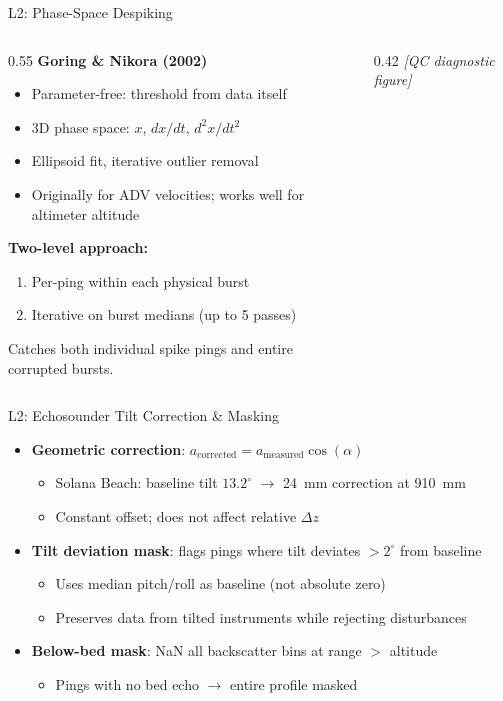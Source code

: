 \documentclass[10pt, aspectratio=169]{beamer}
\begin{document}
\begin{frame}{L2: Phase-Space Despiking}
  \begin{columns}[T]
    \begin{column}{0.55\textwidth}
      \textbf{Goring \& Nikora (2002)}
      \begin{itemize}
        \item Parameter-free: threshold from data itself
        \item 3D phase space: $x$, $dx/dt$, $d^2x/dt^2$
        \item Ellipsoid fit, iterative outlier removal
        \item Originally for ADV velocities; works well for altimeter altitude
      \end{itemize}
      \vspace{0.5em}
      \textbf{Two-level approach:}
      \begin{enumerate}
        \item Per-ping within each physical burst
        \item Iterative on burst medians (up to 5 passes)
      \end{enumerate}
      Catches both individual spike pings and entire corrupted bursts.
    \end{column}
    \begin{column}{0.42\textwidth}
      \centering\textit{[QC diagnostic figure]}
    \end{column}
  \end{columns}
\end{frame}

\begin{frame}{L2: Echosounder Tilt Correction \& Masking}
  \begin{itemize}
    \item \textbf{Geometric correction}: $a_\text{corrected} = a_\text{measured} \cos(\alpha)$
      \begin{itemize}
        \item Solana Beach: baseline tilt $13.2^\circ$ $\rightarrow$ 24~mm correction at 910~mm
        \item Constant offset; does not affect relative $\Delta z$
      \end{itemize}
    \item \textbf{Tilt deviation mask}: flags pings where tilt deviates $> 2^\circ$ from baseline
      \begin{itemize}
        \item Uses median pitch/roll as baseline (not absolute zero)
        \item Preserves data from tilted instruments while rejecting disturbances
      \end{itemize}
    \item \textbf{Below-bed mask}: NaN all backscatter bins at range $>$ altitude
      \begin{itemize}
        \item Pings with no bed echo $\rightarrow$ entire profile masked
      \end{itemize}
  \end{itemize}
\end{frame}
\end{document}
